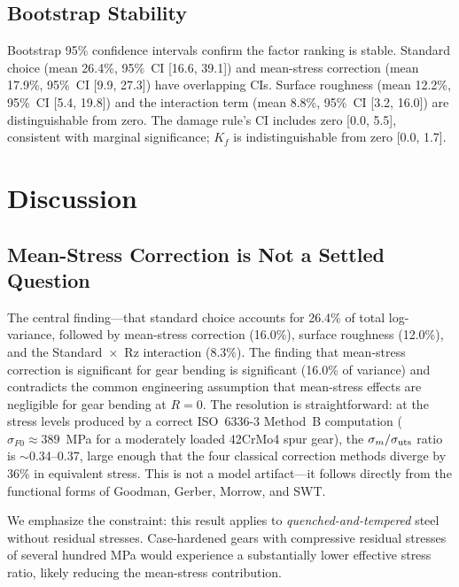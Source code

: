 \documentclass[12pt,a4paper]{article}
\begin{document}
\subsection{Bootstrap Stability}

Bootstrap 95\% confidence intervals confirm the factor ranking is
stable. Standard choice (mean 26.4\%, 95\%~CI [16.6, 39.1]) and
mean-stress correction (mean 17.9\%, 95\%~CI [9.9, 27.3]) have
overlapping CIs. Surface roughness (mean 12.2\%, 95\%~CI [5.4, 19.8])
and the interaction term (mean 8.8\%, 95\%~CI [3.2, 16.0]) are
distinguishable from zero. The damage rule's CI includes zero
[0.0, 5.5], consistent with marginal significance; $K_f$ is
indistinguishable from zero [0.0, 1.7].

\section{Discussion}
\label{sec:discussion}

\subsection{Mean-Stress Correction is Not a Settled Question}

The central finding---that standard choice accounts for 26.4\% of
total log-variance, followed by mean-stress correction (16.0\%), surface
roughness (12.0\%), and the Standard~$\times$~Rz interaction (8.3\%). The
finding that mean-stress correction is significant for gear bending
is significant (16.0\% of variance) and contradicts the common
engineering assumption that mean-stress effects are negligible for gear
bending at $R=0$. The resolution
is straightforward: at the stress levels produced by a correct
ISO~6336-3 Method~B computation ($\sigma_{F0} \approx 389$~MPa for a
moderately loaded 42CrMo4 spur gear), the $\sigma_m/\sigma_{\rm uts}$
ratio is $\sim$0.34--0.37, large enough that the four classical
correction methods diverge by 36\% in equivalent stress. This is not
a model artifact---it follows directly from the functional forms of
Goodman, Gerber, Morrow, and SWT.

We emphasize the constraint: this result applies to
\emph{quenched-and-tempered} steel without residual stresses.
Case-hardened gears with compressive residual stresses of several hundred
MPa would experience a substantially lower effective stress ratio,
likely reducing the mean-stress contribution.
\end{document}
